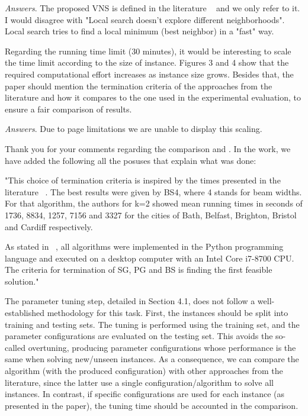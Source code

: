 \documentclass [11pt]{scrartcl}
\begin{document}
	\emph{Answers}. The proposed VNS is defined in the literature ~\cite{mladenovic1997variable} and we only refer to it. I would disagree with "Local search doesn't explore different neighborhoods". Local search tries to find a local minimum (best neighbor) in a "fast" way.



\begin{leftbar}
Regarding the running time limit (30 minutes), it would be interesting to scale the time limit according to the size of instance. Figures 3 and 4 show that the required computational effort increases as instance size grows. Besides that, the paper should mention the termination criteria of the approaches from the literature and how it compares to the one used in the experimental evaluation, to ensure a fair comparison of results.	
\end{leftbar}

\emph{Answers}. Due to page limitations we are unable to display this scaling. 

Thank you for your comments regarding the comparison and . In the work, we have added the following all the posuses that explain what was done:

"This choice of termination criteria is inspired by the times presented in the literature ~\cite{corcoran2021heuristics}. The best results were given by BS4, where 4 stands for beam widths. For that algorithm, the authors for k=2 showed mean running times in seconds of 1736, 8834, 1257, 7156 and 3327 for the cities of Bath, Belfast, Brighton, Bristol and Cardiff respectively.

As stated in ~\cite{corcoran2021heuristics}, all algorithms were implemented in the Python programming language and executed on a desktop computer with an Intel Core i7-8700 CPU. The criteria for termination of SG, PG and BS is finding the first feasible solution."


\begin{leftbar}
The parameter tuning step, detailed in Section 4.1, does not follow a well-established methodology for this task. First, the instances should be split into training and testing sets. The tuning is performed using the training set, and the parameter configurations are evaluated on the testing set. This avoids the so-called overtuning, producing parameter configurations whose performance is the same when solving new/unseen instances. As a consequence, we can compare the algorithm (with the produced configuration) with other approaches from the literature, since the latter use a single configuration/algorithm to solve all instances. In contrast, if specific configurations are used for each instance (as presented in the paper), the tuning time should be accounted in the comparison.
	
\end{leftbar}
\end{document}
